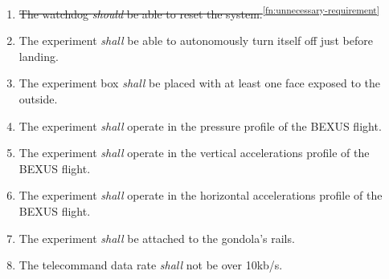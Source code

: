 \begin{enumerate}[label=D.\arabic*]
    \item \st{The watchdog \textit{should} be able to reset the system.}\textsuperscript{\ref{fn:unnecessary-requirement}}
    \item The experiment \textit{shall} be able to autonomously turn itself off just before landing.
    \item The experiment box \textit{shall} be placed with at least one face exposed to the outside.
    \item The experiment \textit{shall} operate in the pressure profile of the BEXUS flight.
    \item The experiment \textit{shall} operate in the vertical accelerations profile of the BEXUS flight.
    \item The experiment \textit{shall} operate in the
    horizontal accelerations profile of the BEXUS flight.
    \item The experiment \textit{shall} be attached to the gondola's rails.
    \item The telecommand data rate \textit{shall} not be over 10kb/s.
\end{enumerate}